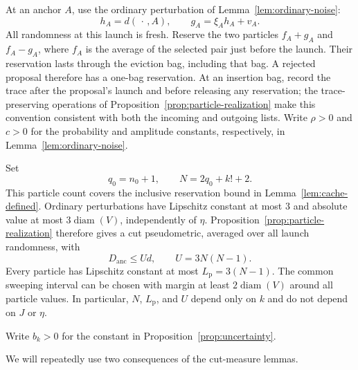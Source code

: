 At an anchor $A$, use the ordinary perturbation of
Lemma~\ref{lem:ordinary-noise}:
\begin{equation}\label{eq:anchor-perturbation}
 h_A=d(\,\cdot\,,A),\qquad g_A=\xi_A h_A+v_A.
\end{equation}
All randomness at this launch is fresh.  Reserve the two particles
$f_A+g_A$ and $f_A-g_A$, where $f_A$ is the average of the selected pair
just before the launch.  Their reservation lasts through the eviction
bag, including that bag.  A rejected proposal therefore has a one-bag
reservation.  At an insertion bag, record the trace after the proposal's
launch and before releasing any reservation; the trace-preserving
operations of Proposition~\ref{prop:particle-realization} make this
convention consistent with both the incoming and outgoing lists.
Write $\rho>0$ and $c>0$ for the probability and amplitude constants,
respectively, in Lemma~\ref{lem:ordinary-noise}.

Set
\[
 q_0=n_0+1,\qquad N=2q_0+k!+2.
\]
This particle count covers the inclusive reservation bound in
Lemma~\ref{lem:cache-defined}.  Ordinary perturbations have Lipschitz
constant at most $3$ and absolute value at most $3\operatorname{diam}(V)$,
independently of $\eta$.  Proposition~\ref{prop:particle-realization}
therefore gives a cut pseudometric, averaged over all launch randomness, with
\begin{equation}\label{eq:anchor-upper}
 D_{\mathrm{anc}}\leq U d,\qquad U=3N(N-1).
\end{equation}
Every particle has Lipschitz constant at most
$L_{\mathrm{p}}=3(N-1)$.  The common sweeping interval can be chosen with
margin at least $2\operatorname{diam}(V)$ around all particle values.
In particular, $N$, $L_{\mathrm{p}}$, and $U$ depend only on $k$ and do
not depend on $J$ or $\eta$.

Write $b_k>0$ for the constant in
Proposition~\ref{prop:uncertainty}.

We will repeatedly use two consequences of the cut-measure lemmas.

